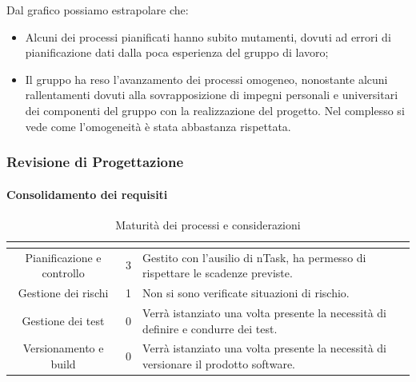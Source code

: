 Dal grafico possiamo estrapolare che:
\begin{itemize}
	\item Alcuni dei processi pianificati hanno subito mutamenti, dovuti ad errori di pianificazione dati dalla poca esperienza del gruppo di lavoro;
	\item Il gruppo ha reso l'avanzamento dei processi omogeneo, nonostante alcuni rallentamenti dovuti alla sovrapposizione di impegni personali e universitari dei componenti del gruppo con la realizzazione del progetto. Nel complesso si vede come l'omogeneità è stata abbastanza rispettata.
\end{itemize}

\subsubsection{Revisione di Progettazione}

\paragraph{Consolidamento dei requisiti}\MiniSpazio
\renewcommand{\arraystretch}{1.5}
\begin{table}[H]
	\begin{center}
		\begin{tabular}{|c|c|p{6.8cm}|}
			\hline
			\rowcolor{title_row}
			\textbf{\color{title_text}{Processo}} & \textbf{\color{title_text}{Livello di maturità}} & \textbf{\color{title_text}{Considerazioni}} \\
			\hline
			{Pianificazione e controllo} & {3} & {Gestito con l'ausilio di nTask, ha permesso di rispettare le scadenze previste.}\\	
			\hline
			{Gestione dei rischi} & {1} & {Non si sono verificate situazioni di rischio.}\\	
			\hline
			{Gestione dei test} & {0} & {Verrà istanziato una volta presente la necessità di definire e condurre dei test.}\\	
			\hline
			{Versionamento e build} & {0} & {Verrà istanziato una volta presente la necessità di versionare il prodotto software.}\\	
			\hline
		\end{tabular}
		\caption[Maturità dei processi, Consolidamento]{Maturità dei processi e considerazioni}	
		\label{tabella: considerazioni sulla maturità dei processi raggiunta}
	\end{center}
\end{table}


